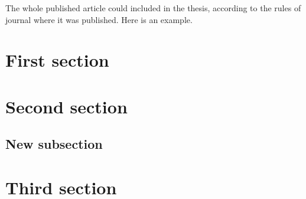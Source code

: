 \documentclass[12pt,a4paper]{article}
\begin{document}
	\Large
	The whole published article could included in the thesis, according to the rules of journal where it was published. Here is an example.
	\normalsize
	\section{First section}
	\lipsum[1-5]
	\section{Second section}
		\subsection{New subsection}
	\lipsum[7-9]
	\section{Third section}
	\lipsum[10-12]
\end{document}
